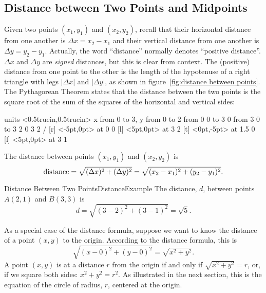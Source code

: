 \subsection{Distance between Two Points and Midpoints}\label{sec:DistanceAndMidpoints}
Given two points $(x_1,y_1)$ and $(x_2,y_2)$, recall that their
horizontal distance from one another is $\Delta x=x_2-x_1$ and their
vertical distance from one another is $\Delta y=y_2-y_1$. Actually,
the word ``distance'' normally denotes ``positive distance''. $\Delta
x$ and $\Delta y$ are {\it signed\/} distances, but this is clear from
context. The (positive) distance from one point to the other
is the length of the hypotenuse of a right triangle with legs $|\Delta
x|$ and $|\Delta y|$, as shown in figure~\ref{fig:distance between
points}.  The Pythagorean Theorem states that the distance between
the two points is the square root of the sum of the squares of the
horizontal and vertical sides:

\figure[!ht]
\centerline{\vbox{\beginpicture
\normalgraphs
\setcoordinatesystem units <0.5truein,0.5truein>
\setplotarea x from 0 to 3, y from 0 to 2
\putrule from 0 0 to 3 0
\putrule from 3 0 to 3 2
 0 3 2 /
 [r] <-5pt,0pt> at 0 0
 [l] <5pt,0pt> at 3 2
 [t] <0pt,-5pt> at 1.5 0
 [l] <5pt,0pt> at 3 1
\endpicture}}
\caption{Distance between two points (here, $\Delta x$ and $\Delta y$ are positive). \label{fig:distance between points}}
\endfigure

\begin{formulabox}
The distance between points $(x_1,y_1)$ and $(x_2,y_2)$ is
$$\hbox{distance}=\sqrt{(\Delta x)^2+(\Delta y)^2}=\sqrt{(x_2-x_1)^2+ (y_2-y_1)^2}.$$
\end{formulabox}

\bigskip

\begin{example}{Distance Between Two Points}{DistanceExample}
The distance, $d$, between points $A(2,1)$ and $B(3,3)$ is 
$$d=\sqrt{(3-2)^2+(3-1)^2}=\sqrt{5}.$$
\vspace{-1cm}
\end{example}

As a special case of the distance formula, suppose we want to know the
distance of a point $(x,y)$ to the origin.  According to the distance
formula, this is $$\sqrt{(x-0)^2+(y-0)^2}=\sqrt{x^2+y^2}.$$
A point $(x,y)$ is at a distance $r$ from the origin if and only if
$\sqrt{x^2+y^2}=r$, or, if we square both sides: $x^2+y^2=r^2$.  As illustrated
in the next section, this is the equation of the circle of radius, $r$, centered at the origin.

